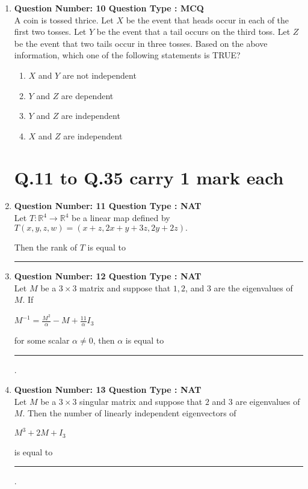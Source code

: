 \documentclass[journal,,12pt,onecolumn]{IEEEtran}
\theoremstyle{remark}
\begin{document}
\begin{enumerate}
\begin{enumerate}
\end{enumerate}
\bigskip
\item \textbf{Question Number: 10 Question Type : MCQ}\\
A coin is tossed thrice. Let $ X $ be the event that heads occur in each of the first two tosses. Let $ Y $ be the event that a tail occurs on the third toss. Let $ Z $ be the event that two tails occur in three tosses. Based on the above information, which one of the following statements is TRUE? \\

\begin{enumerate}
    \item $ X $ and $ Y $ are not independent
    \item $ Y $ and $ Z $ are dependent
    \item $ Y $ and $ Z $ are independent
    \item $ X $ and $ Z $ are independent
\end{enumerate}
\bigskip
\section*{Q.11 to Q.35 carry 1 mark each}
\item \textbf{Question Number: 11 Question Type : NAT}\\
Let $ T : \mathbb{R}^4 \to \mathbb{R}^4 $ be a linear map defined by \\

$T(x, y, z, w) = (x + z, 2x + y + 3z, 2y + 2z).$

Then the rank of $ T $ is equal to \rule{1cm}{0.15mm}
\bigskip
\item \textbf{Question Number: 12 Question Type : NAT}\\
Let $ M $ be a $ 3 \times 3 $ matrix and suppose that $ 1, 2 $, and $ 3 $ are the eigenvalues of $ M $. If 

$M^{-1} = \frac{M^2}{\alpha} - M + \frac{11}{\alpha} I_3$

for some scalar $ \alpha \neq 0 $, then $ \alpha $ is equal to \rule{1cm}{0.15mm}.
\bigskip
\item \textbf{Question Number: 13 Question Type : NAT}\\
Let $ M $ be a $ 3 \times 3 $ singular matrix and suppose that $ 2 $ and $ 3 $ are eigenvalues of $ M $. Then the number of linearly independent eigenvectors of 

$M^3 + 2M + I_3$

is equal to \rule{1cm}{0.15mm}.
\end{enumerate}
\end{document}
